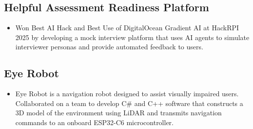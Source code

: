 \documentclass[11pt]{article}
\begin{document}
\subsection*{Helpful Assessment Readiness Platform}
\begin{itemize}
    \item Won Best AI Hack and Best Use of DigitalOcean Gradient AI at HackRPI 2025 by developing a mock interview platform that uses AI agents to simulate interviewer personas and provide automated feedback to users.
\end{itemize}

\subsection*{Eye Robot}
\begin{itemize}
    \item Eye Robot is a navigation robot designed to assist visually impaired users. Collaborated on a team to develop C\# and C++ software that constructs a 3D model of the environment using LiDAR and transmits navigation
    commands to an onboard ESP32-C6 microcontroller.
\end{itemize}
\end{document}
